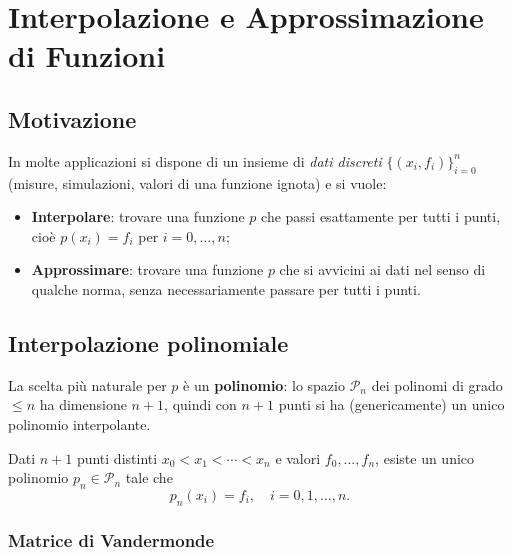 \chapter{Interpolazione e Approssimazione di Funzioni}
\label{ch:interpolazione}

\section{Motivazione}

In molte applicazioni si dispone di un insieme di \emph{dati discreti}
$\{(x_i, f_i)\}_{i=0}^n$ (misure, simulazioni, valori di una funzione ignota) e si
vuole:
\begin{itemize}
  \item \textbf{Interpolare}: trovare una funzione $p$ che passi esattamente per tutti
        i punti, cioè $p(x_i) = f_i$ per $i = 0,\ldots,n$;
  \item \textbf{Approssimare}: trovare una funzione $p$ che si avvicini ai dati nel
        senso di qualche norma, senza necessariamente passare per tutti i punti.
\end{itemize}

\section{Interpolazione polinomiale}
\label{sec:interp_polin}

La scelta più naturale per $p$ è un \textbf{polinomio}: lo spazio
$\mathcal{P}_n$ dei polinomi di grado $\leq n$ ha dimensione $n+1$, quindi con
$n+1$ punti si ha (genericamente) un unico polinomio interpolante.

\begin{theorem}
Dati $n+1$ punti distinti $x_0 < x_1 < \cdots < x_n$ e valori $f_0,\ldots,f_n$,
esiste un unico polinomio $p_n \in \mathcal{P}_n$ tale che
\begin{equation}
  p_n(x_i) = f_i, \quad i = 0, 1, \ldots, n.
  \label{eq:interp_cond}
\end{equation}
\end{theorem}

\subsection{Matrice di Vandermonde}

